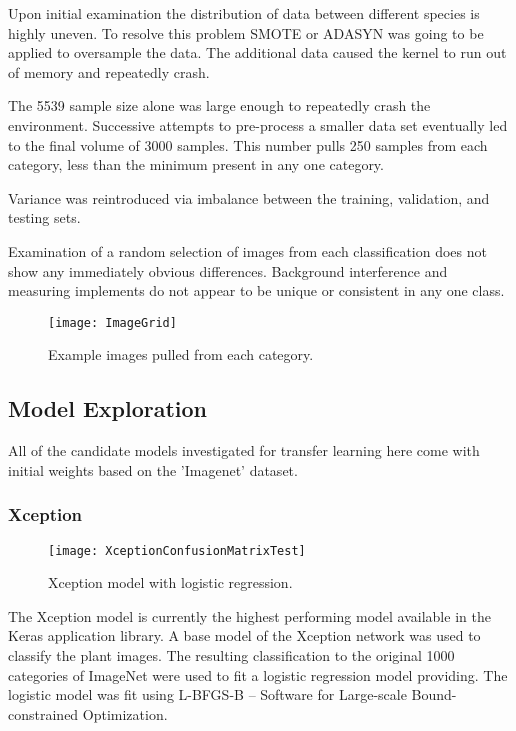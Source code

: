 \documentclass[]{article}
\begin{document}
Upon initial examination the distribution of data between different species is highly uneven.
To resolve this problem SMOTE\cite{Bowyer2011} or ADASYN\cite{Bai2008}  was going to be applied to oversample the data.
The additional data caused the kernel to run out of memory and repeatedly crash.

The 5539 sample size alone was large enough to repeatedly crash the environment.
Successive attempts to pre-process a smaller data set eventually led to the final volume of 3000 samples. 
This number pulls 250 samples from each category, less than the minimum present in any one category. 

Variance was reintroduced via imbalance between the training, validation, and testing sets.

Examination of a random selection of images from each classification does not show any immediately obvious differences. Background interference and measuring implements do not appear to be unique or consistent in any one class.
\begin{figure}[H]
	\texttt{[image: ImageGrid]}
	\caption{Example images pulled from each category.}
\end{figure}

\clearpage

\subsection{Model Exploration}

All of the candidate models investigated for transfer learning here come with initial weights based on the 'Imagenet' dataset.

\subsubsection{Xception}

\begin{wrapfigure}{r}{0.45\textwidth}
	\vspace{-6em}
	\begin{center}
		\texttt{[image: XceptionConfusionMatrixTest]}
	\end{center}
	\caption{Xception model with logistic regression.}	
\end{wrapfigure}

The Xception model is currently the highest performing model available in the Keras application library\cite{Chollet2016}.
A base model of the Xception network was used to classify the plant images. 
The resulting classification to the original 1000 categories of ImageNet were used to fit a logistic regression model providing.
The logistic model was fit using L-BFGS-B – Software for Large-scale Bound-constrained Optimization\cite{Zhu1997}.
\end{document}
